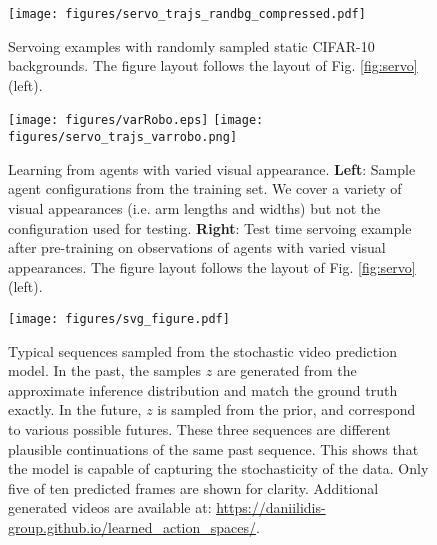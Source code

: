 \documentclass{article} %
\begin{document}
\begin{figure}
  \centering
  \texttt{[image: figures/servo\_trajs\_randbg\_compressed.pdf]} 
  \caption{Servoing examples with randomly sampled static CIFAR-10 backgrounds. The figure layout follows the layout of Fig. \ref{fig:servo} (left).}
  \label{fig:serv_rand_bg}
\end{figure}\begin{figure}
\centering
\hspace{0.25cm}
\texttt{[image: figures/varRobo.eps]}
\hspace{0.25cm}
\texttt{[image: figures/servo\_trajs\_varrobo.png]}
\vspace{-7pt}
\caption{Learning from agents with varied visual appearance. \textbf{Left}: 
Sample agent configurations from the training set. We cover a variety of visual appearances (i.e. arm lengths and widths) but not the configuration used for testing. \textbf{Right}: Test time servoing example after pre-training on observations of agents with varied visual appearances. The figure layout follows the layout of Fig. \ref{fig:servo} (left).
} 
   \label{fig:serv_varRobo}
   \vspace{-12pt}
\end{figure}\begin{figure}[b]
  \centering
  \texttt{[image: figures/svg\_figure.pdf]}
\vspace{-7pt}
  \caption{Typical sequences sampled from the stochastic video prediction model. In the past, the samples $z$ are generated from the approximate inference distribution and match the ground truth exactly. In the future, $z$ is sampled from the prior, and correspond to various possible futures. These three sequences are different plausible continuations of the same past sequence. This shows that the model is capable of capturing the stochasticity of the data. Only five of ten predicted frames are shown for clarity. Additional generated videos are available at: \url{https://daniilidis-group.github.io/learned_action_spaces/}.}
  \label{fig:svg}
   \vspace{-10pt}
\end{figure}\begin{figure}
  \centering


\end{figure}
\end{document}
